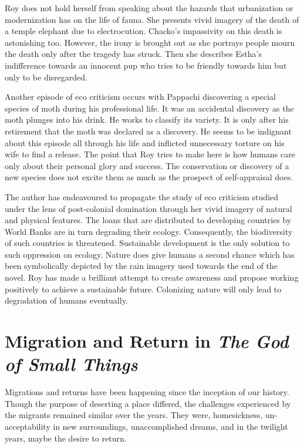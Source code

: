 Roy does not hold herself from speaking about the hazards that urbanization or modernization has on the life of fauna. She presents vivid imagery of the death of a temple elephant due to electrocution. Chacko’s impassivity on this death is astonishing too. However, the irony is brought out as she portrays people mourn the death only after the tragedy has struck. Then she describes Estha’s indifference towards an innocent pup who tries to be friendly towards him but only to be disregarded. 

Another episode of eco criticism occurs with Pappachi discovering a special species of moth during his professional life. It was an accidental discovery as the moth plunges into his drink. He works to classify its variety. It is only after his retirement that the moth was declared as a discovery. He seems to be indignant about this episode all through his life and inflicted unnecessary torture on his wife to find a release. The point that Roy tries to make here is how humans care only about their personal glory and success. The conservation or discovery of a new species does not excite them as much as the prospect of self-appraisal does. 

The author has endeavoured to propagate the study of eco criticism studied under the lens of post-colonial domination through her vivid imagery of natural and physical features. The loans that are distributed to developing countries by World Banks are in turn degrading their ecology. Consequently, the biodiversity of such countries is threatened. Sustainable development is the only solution to such oppression on ecology. Nature does give humans a second chance which has been symbolically depicted by the rain imagery used towards the end of the novel. Roy has made a brilliant attempt to create awareness and propose working positively to achieve a sustainable future. Colonizing nature will only lead to degradation of humans eventually. 

\section{Migration and Return in \emph{The God of Small Things}}

Migrations and returns have been happening since the inception of our history. Though the purpose of deserting a place differed, the challenges experienced by the migrants remained similar over the years. They were, homesickness, un-acceptability in new surroundings, unaccomplished dreams, and in the twilight years, maybe the desire to return. 

